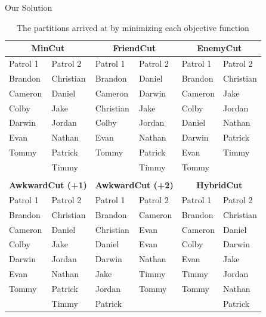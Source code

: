 \documentclass{beamer}
\begin{document}
\begin{frame}{Our Solution}

\begin{table}[h]
\centering
\footnotesize
\begin{tabular}{ |l|l|l|l|l|l| }
\hline
\multicolumn{2}{|c|}{\textbf{MinCut}} & \multicolumn{2}{|c|}{\textbf{FriendCut}} & \multicolumn{2}{|c|}{\textbf{EnemyCut}}\\
\hline
Patrol 1 & Patrol 2 & Patrol 1 & Patrol 2 & Patrol 1 & Patrol 2\\
\hline
Brandon & Christian & Brandon & Daniel & Brandon & Christian\\
Cameron & Daniel & Cameron & Darwin & Cameron & Jake\\
Colby & Jake & Christian & Jake & Colby & Jordan\\
Darwin & Jordan & Colby & Jordan  & Daniel & Nathan\\
Evan & Nathan & Evan & Nathan & Darwin & Patrick\\
Tommy & Patrick & Tommy & Patrick & Evan & Timmy\\
& Timmy & & Timmy & Tommy & \\
\hline
\multicolumn{6}{|c|}{\hphantom{1}} \\
\hline
\multicolumn{2}{|c|}{\textbf{AwkwardCut (+1)}} & \multicolumn{2}{|c|}{\textbf{AwkwardCut (+2)}} & \multicolumn{2}{|c|}{\textbf{HybridCut}} \\
\hline
Patrol 1 & Patrol 2 & Patrol 1 & Patrol 2 & Patrol 1 & Patrol 2\\
\hline
Brandon & Christian & Brandon & Cameron & Brandon & Christian\\
Cameron & Daniel & Christian & Evan & Cameron & Daniel\\
Colby & Jake & Daniel & Evan & Colby & Darwin\\
Darwin & Jordan & Darwin & Nathan & Evan & Jake\\
Evan & Nathan & Jake & Timmy & Timmy & Jordan\\
Tommy & Patrick & Jordan & Tommy & Tommy & Nathan\\
\hphantom{1} & Timmy & Patrick & \hphantom{1} & \hphantom{1} & Patrick\\
\hline
\end{tabular}
\caption{The partitions arrived at by minimizing each objective function}
\end{table}

\end{frame}
\end{document}
